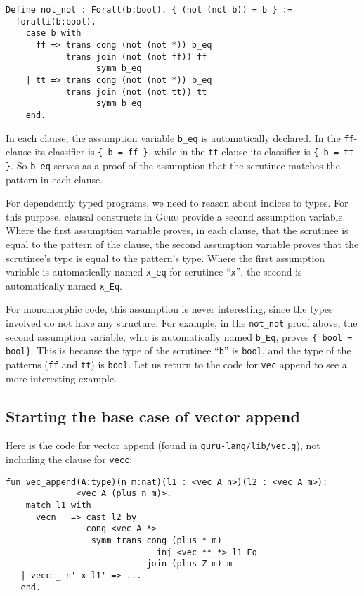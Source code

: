 \documentclass{book}[12pt]
\newcommand{\guru}[0]{\textsc{Guru}\xspace}
\begin{document}
\begin{verbatim}
Define not_not : Forall(b:bool). { (not (not b)) = b } :=
  foralli(b:bool).
    case b with
      ff => trans cong (not (not *)) b_eq
            trans join (not (not ff)) ff
                  symm b_eq
    | tt => trans cong (not (not *)) b_eq
            trans join (not (not tt)) tt
                  symm b_eq           
    end.
\end{verbatim}

\noindent In each clause, the assumption variable \texttt{b\_eq} is
automatically declared.  In the \texttt{ff}-clause its classifier is
\texttt{\{ b = ff \}}, while in the \texttt{tt}-clause its classifier
is \texttt{\{ b = tt \}}.  So \texttt{b\_eq} serves as a proof of the
assumption that the scrutinee matches the pattern in each clause.

For dependently typed programs, we need to reason about indices to
types.  For this purpose, clausal constructs in \guru provide a second
assumption variable.  Where the first assumption variable proves, in
each clause, that the scrutinee is equal to the pattern of the clause,
the second assumption variable proves that the scrutinee's type is
equal to the pattern's type.  Where the first assumption variable is
automatically named \texttt{x\_eq} for scrutinee ``\texttt{x}'', the
second is automatically named \texttt{x\_Eq}.  

For monomorphic code, this assumption is never interesting, since the
types involved do not have any structure.  For example, in the
\texttt{not\_not} proof above, the second assumption variable, whic is
automatically named \texttt{b\_Eq}, proves \texttt{\{ bool = bool\}}.
This is because the type of the scrutinee ``\texttt{b}'' is
\texttt{bool}, and the type of the patterns (\texttt{ff} and
\texttt{tt}) is \texttt{bool}.  Let us return to the code for
\texttt{vec} append to see a more interesting example.

\subsection{Starting the base case of vector append}

Here is the code for vector append (found in
\texttt{guru-lang/lib/vec.g}), not including the clause for
\texttt{vecc}:

\begin{verbatim}
fun vec_append(A:type)(n m:nat)(l1 : <vec A n>)(l2 : <vec A m>):
              <vec A (plus n m)>.
    match l1 with
      vecn _ => cast l2 by
                cong <vec A *>
                 symm trans cong (plus * m)
                              inj <vec ** *> l1_Eq
                            join (plus Z m) m
   | vecc _ n' x l1' => ...
   end.
\end{verbatim}
\end{document}
